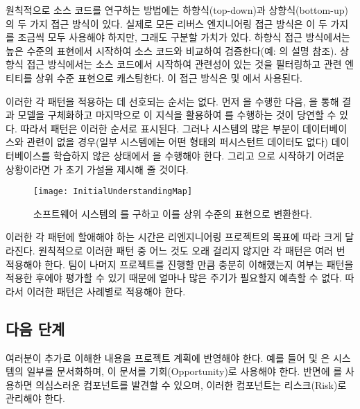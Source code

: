 \documentclass[a4paper,10pt,twoside]{book}
\begin{document}
원칙적으로 소스 코드를 연구하는 방법에는 하향식(top-down)과 상향식(bottom-up)의 두 가지 접근 방식이 있다. 실제로 모든 리버스 엔지니어링 접근 방식은 이 두 가지를 조금씩 모두 사용해야 하지만, 그래도 구분할 가치가 있다. 하향식 접근 방식에서는 높은 수준의 표현에서 시작하여 소스 코드와 비교하여 검증한다(예: 의 설명 참조). 상향식 접근 방식에서는 소스 코드에서 시작하여 관련성이 있는 것을 필터링하고 관련 엔티티를 상위 수준 표현으로 캐스팅한다. 이 접근 방식은  및 에서 사용된다.

이러한 각 패턴을 적용하는 데 선호되는 순서는 없다. 먼저 을 수행한 다음, 을 통해 결과 모델을 구체화하고 마지막으로 이 지식을 활용하여 를 수행하는 것이 당연할 수 있다. 따라서 패턴은 이러한 순서로 표시된다. 그러나 시스템의 많은 부분이 데이터베이스와 관련이 없을 경우(일부 시스템에는 어떤 형태의 퍼시스턴트 데이터도 없다) 데이터베이스를 학습하지 않은 상태에서 을 수행해야 한다. 그리고 으로 시작하기 어려운 상황이라면 가 초기 가설을 제시해 줄 것이다.

\begin{figure}
\begin{center}
\texttt{[image: InitialUnderstandingMap]}
\caption{소프트웨어 시스템의 를 구하고 이를 상위 수준의 표현으로 변환한다.}
\end{center}
\end{figure}

이러한 각 패턴에 할애해야 하는 시간은 리엔지니어링 프로젝트의 목표에 따라 크게 달라진다. 원칙적으로 이러한 패턴 중 어느 것도 오래 걸리지 않지만 각 패턴은 여러 번 적용해야 한다. 팀이 나머지 프로젝트를 진행할 만큼 충분히 이해했는지 여부는 패턴을 적용한 후에야 평가할 수 있기 때문에 얼마나 많은 주기가 필요할지 예측할 수 없다. 따라서 이러한 패턴은 사례별로 적용해야 한다.

\subsection*{다음 단계}

여러분이 추가로 이해한 내용을 프로젝트 계획에 반영해야 한다. 예를 들어  및 은 시스템의 일부를 문서화하며, 이 문서를 기회(Opportunity)로 사용해야 한다. 반면에 를 사용하면 의심스러운 컴포넌트를 발견할 수 있으며, 이러한 컴포넌트는 리스크(Risk)로 관리해야 한다.
\end{document}
